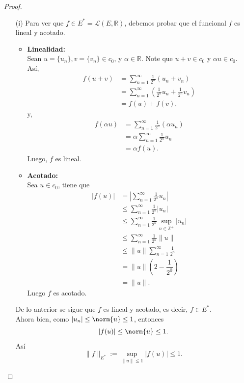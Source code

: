 \begin{proof}
\begin{itemize}
    \item[(i)] Para ver que $f\in E^* = \mathcal{L}(E, \mathbb{R})$, debemos probar que el funcional $f$ es lineal y acotado.
    \begin{itemize}
        \item \textbf{Linealidad:}\\
        Sean $u = \{u_n\}, v = \{v_n\} \in c_0$, y $\alpha \in \mathbb{R}$. Note que $u+v \in c_0$ y $\alpha u \in c_0$. Así,
        \begin{align*}
            f(u + v) &= \sum_{n=1}^\infty \frac{1}{2^n} (u_n + v_n)\\
            &= \sum_{n=1}^\infty \left( \frac{1}{2^n} u_n + \frac{1}{2^n} v_n \right)\\
            &= f(u) + f(v),
        \end{align*}
        y, 
        \begin{align*}
            f(\alpha u) &= \sum_{n=1}^\infty \frac{1}{2^n} (\alpha u_n)\\
            &= \alpha \sum_{n=1}^\infty \frac{1}{2^n} u_n\\
            &= \alpha f(u).
        \end{align*}
        Luego, $f$ es lineal.

        \item \textbf{Acotado:}\\
        Sea $u \in c_0$, tiene que
        \begin{align*}
            |f(u)| &= \left| \sum_{n=1}^\infty \frac{1}{2^n} u_n \right|\\
            &\leq \sum_{n=1}^\infty \frac{1}{2^n} |u_n|\\
            &\leq \sum_{n=1}^\infty \frac{1}{2^n} \displaystyle\sup_{n\in\mathbb{Z}^+}|u_n|\\
            &\leq \sum_{n=1}^\infty \frac{1}{2^n} \|u\|\\
            &\leq \|u\|  \sum_{n=1}^\infty \frac{1}{2^n}\\
            &= \|u\| \left(2 - \dfrac{1}{2^0}\right)\\
            &= \|u\|.
        \end{align*}
        Luego $f$ es acotado.
    \end{itemize}
    De lo anterior se sigue que $f$ es lineal y acotado, es decir, $f\in E^*$.\\
    Ahora bien, como $|u_n|\leq \norm{u}\leq 1$, entonces
    $$|f(u)| \leq \norm{u}\leq 1.$$
    Así
    $$\|f\|_{E^*} := \sup_{\|u\| \leq 1} |f(u)| \leq 1.$$
    

\end{itemize}
\end{proof}
